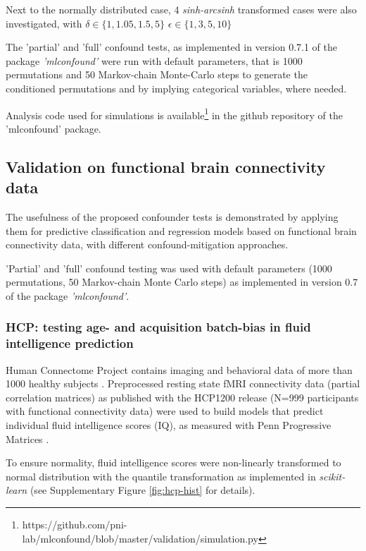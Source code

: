 \documentclass{article}
\begin{document}
Next to the normally distributed case, 4 \emph{sinh-arcsinh} transformed cases were also investigated, with $\delta \in \{1, 1.05, 1.5, 5\}$ $\epsilon \in \{1, 3, 5, 10\}$ 

The 'partial' and 'full' confound tests, as implemented in version 0.7.1 of the package \emph{'mlconfound'} were run with default parameters, that is 1000 permutations and 50 Markov-chain Monte-Carlo steps to generate the conditioned permutations and by implying categorical variables, where needed.

Analysis code used for simulations is available\footnote{https://github.com/pni-lab/mlconfound/blob/master/validation/simulation.py} in the github repository of the 'mlconfound' package.

\subsection{Validation on functional brain connectivity data}

The usefulness of the proposed confounder tests is demonstrated by applying them for predictive classification and regression models based on functional brain connectivity data, with different confound-mitigation approaches. 

'Partial' and 'full' confound testing was used with default parameters (1000 permutations, 50 Markov-chain Monte Carlo steps) as implemented in version 0.7 of the package \emph{'mlconfound'}.

\subsubsection*{HCP: testing age- and acquisition batch-bias in fluid intelligence prediction}

Human Connectome Project contains imaging and behavioral data of more than 1000 healthy subjects \citep{van2013wu}. Preprocessed resting state fMRI connectivity data (partial correlation matrices) \citep{glasser2013minimal} as published with the HCP1200 release (N=999 participants with functional connectivity data) were used to build models that predict individual fluid intelligence scores (IQ), as measured with Penn Progressive Matrices \citep{duncan2000neural}.

To ensure normality, fluid intelligence scores were non-linearly transformed to normal distribution with the quantile transformation \citep{beasley2009rank} as implemented in \emph{scikit-learn} \citep{pedregosa2011scikit} (see Supplementary Figure \ref{fig:hcp-hist} for details).
\end{document}
